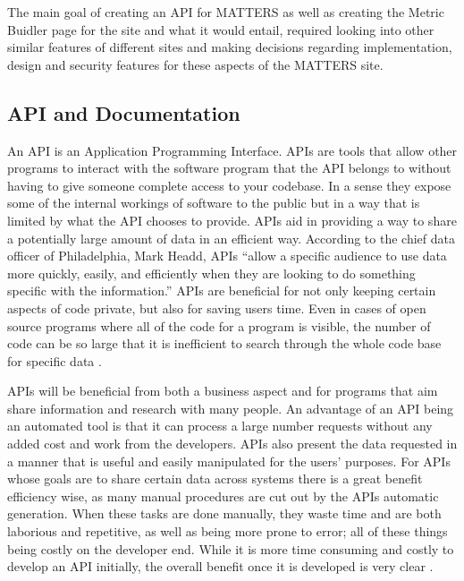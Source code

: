 		The main goal of creating an API for MATTERS as well as creating the Metric 
		Buidler page for the site and what it would entail, required looking into other 
		similar features of different sites and making decisions regarding implementation,
		design and security features for these aspects of the MATTERS site.

	\subsection{API and Documentation}

		An API is an Application Programming Interface. APIs are tools that allow other 
		programs to interact with the software program that the API belongs to without 
		having to give someone complete access to your codebase. In a sense they expose 
		some of the internal workings of software to the public but in a way that is 
		limited by what the API chooses to provide. APIs aid in providing a way to share 
		a potentially large amount of data in an efficient way. According to the chief 
		data officer of Philadelphia, Mark Headd, APIs “allow a specific audience to use 
		data more quickly, easily, and efficiently when they are looking to do something 
		specific with the information.” APIs are beneficial for not only keeping certain 
		aspects of code private, but also for saving users time. Even in cases of open 
		source programs where all of the code for a program is visible, the number of 
		code can be so large that it is inefficient to search through the whole code base 
		for specific data \cite{govapi}. 

		APIs will be beneficial from both a business aspect and for programs that aim share 
		information and research with many people. An advantage of an API being an automated 
		tool is that it can process a large number requests without any added cost and work 
		from the developers. APIs also present the data requested in a manner that is useful 
		and easily manipulated for the users’ purposes. For APIs whose goals are to share 
		certain data across systems there is a great benefit efficiency wise, as many manual 
		procedures are cut out by the APIs automatic generation. When these tasks are done 
		manually, they waste time and are both laborious and repetitive, as well as being more 
		prone to error; all of these things being costly on the developer end. While it is more 
		time consuming and costly to develop an API initially, the overall benefit once it is 
		developed is very clear \cite{govapi}.

